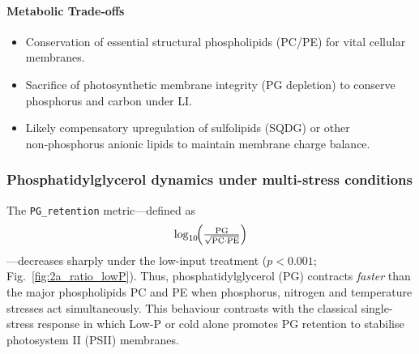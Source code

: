 \documentclass[10pt,letterpaper]{article}
\begin{document}
\paragraph{Metabolic Trade‑offs}
\begin{itemize}
  \item Conservation of essential structural phospholipids (PC/PE) for vital cellular membranes.
  \item Sacrifice of photosynthetic membrane integrity (PG depletion) to conserve phosphorus and carbon under LI.
  \item Likely compensatory upregulation of sulfolipids (SQDG) or other non‑phosphorus anionic lipids to maintain membrane charge balance.
\end{itemize}




\subsubsection*{Phosphatidylglycerol dynamics under multi-stress conditions}

The \texttt{PG\_retention} metric---defined as%
\[
  \log_{10}\!\Bigl(\tfrac{\text{PG}}{\sqrt{\text{PC}\cdot\text{PE}}}\Bigr)
\]
---decreases sharply under the low-input treatment
($p<0.001$;
Fig.~\ref{fig:2a_ratio_lowP}).
Thus, phosphatidylglycerol (PG) contracts \emph{faster} than the major
phospholipids PC and PE when phosphorus, nitrogen and temperature
stresses act simultaneously.
This behaviour contrasts with the classical single-stress response in
which Low-P or cold alone promotes PG retention to stabilise photosystem II
(PSII) membranes.
\end{document}
